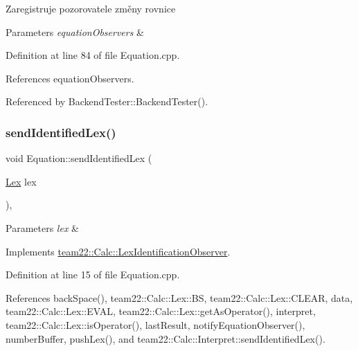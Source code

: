 Zaregistruje pozorovatele změny rovnice 
\begin{DoxyParams}{Parameters}
{\em equation\+Observers} & \\
\hline
\end{DoxyParams}


Definition at line 84 of file Equation.\+cpp.



References equation\+Observers.



Referenced by Backend\+Tester\+::\+Backend\+Tester().

\mbox{\label{classteam22_1_1_calc_1_1_equation_ad5768951865500ec7fc514f676de2851}} 
\subsubsection{\texorpdfstring{send\+Identified\+Lex()}{sendIdentifiedLex()}}
{\footnotesize\ttfamily void Equation\+::send\+Identified\+Lex (\begin{DoxyParamCaption}\item[{\hyperlink{classteam22_1_1_calc_1_1_lex}{Lex}}]{lex }\end{DoxyParamCaption})\hspace{0.3cm}{\ttfamily [override]}, {\ttfamily [virtual]}}


\begin{DoxyParams}{Parameters}
{\em lex} & \\
\hline
\end{DoxyParams}


Implements \hyperlink{classteam22_1_1_calc_1_1_lex_identification_observer_ac139f75c560625ec6fdb2e34cf0d4884}{team22\+::\+Calc\+::\+Lex\+Identification\+Observer}.



Definition at line 15 of file Equation.\+cpp.



References back\+Space(), team22\+::\+Calc\+::\+Lex\+::\+BS, team22\+::\+Calc\+::\+Lex\+::\+C\+L\+E\+AR, data, team22\+::\+Calc\+::\+Lex\+::\+E\+V\+AL, team22\+::\+Calc\+::\+Lex\+::get\+As\+Operator(), interpret, team22\+::\+Calc\+::\+Lex\+::is\+Operator(), last\+Result, notify\+Equation\+Observer(), number\+Buffer, push\+Lex(), and team22\+::\+Calc\+::\+Interpret\+::send\+Identified\+Lex().




